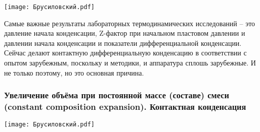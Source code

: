 \documentclass[main.tex]{subfiles}
\begin{document}
\begin{center}
\texttt{[image: Брусиловский.pdf]}
\end{center}

Самые важные результаты лабораторных термодинамических исследований -- это давление начала конденсации, Z-фактор при начальном пластовом давлении и давлении начала конденсации и показатели дифференциальной конденсации.
Сейчас делают контактную дифференциальную конденсацию в соответствии с опытом зарубежным, поскольку и методики, и аппаратура сплошь зарубежные.
И не только поэтому, но это основная причина.

\subsubsection{Увеличение объёма при постоянной массе (составе) смеси (constant composition expansion). Контактная конденсация}

\begin{center}
\texttt{[image: Брусиловский.pdf]}
\end{center}
\end{document}
